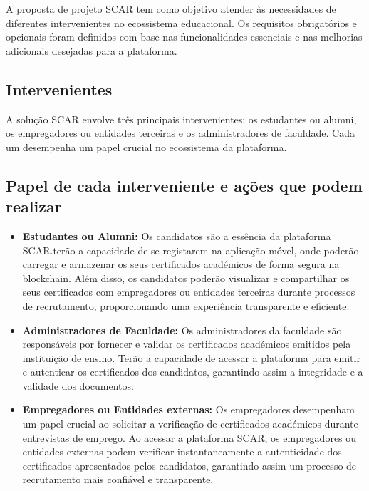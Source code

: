 \documentclass[10pt]{article}
\begin{document}
A proposta de projeto SCAR tem como objetivo atender às necessidades de diferentes intervenientes no ecossistema educacional.
Os requisitos obrigatórios e opcionais foram definidos com base nas funcionalidades essenciais e nas melhorias adicionais
desejadas para a plataforma.

\subsection*{Intervenientes}

A solução SCAR envolve três principais intervenientes: os estudantes ou alumni, os empregadores ou entidades terceiras e os administradores
de faculdade. Cada um desempenha um papel crucial no ecossistema da plataforma.

\subsection*{Papel de cada interveniente e ações que podem realizar}

\begin{itemize}

    \item \textbf{Estudantes ou Alumni:} Os candidatos são a essência da plataforma SCAR.\@Eles terão a capacidade de se registarem na
          aplicação móvel, onde poderão carregar e armazenar os seus certificados académicos de forma segura na blockchain.
          Além disso, os candidatos poderão visualizar e compartilhar os seus certificados com empregadores ou entidades terceiras durante processos
          de recrutamento, proporcionando uma experiência transparente e eficiente.

    \item \textbf{Administradores de Faculdade:} Os administradores da faculdade são responsáveis por fornecer e validar
          os certificados académicos emitidos pela instituição de ensino. Terão a capacidade de acessar a plataforma
          para emitir e autenticar os certificados dos candidatos, garantindo assim a integridade e a validade dos documentos.

    \item \textbf{Empregadores ou Entidades externas:} Os empregadores desempenham um papel crucial ao solicitar a verificação de certificados
          académicos durante entrevistas de emprego. Ao acessar a plataforma SCAR, os empregadores ou entidades externas podem verificar
          instantaneamente a autenticidade dos certificados apresentados pelos candidatos, garantindo assim um processo
          de recrutamento mais confiável e transparente.

\end{itemize}
\end{document}
